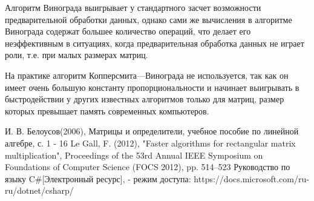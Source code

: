 \documentclass[12pt]{report}
\begin{document}
Алгоритм Винограда выигрывает у стандартного засчет возможности предварительной обработки данных, однако сами же вычисления в алгоритме Винограда содержат большее количество операций, что делает его неэффективным в ситуациях, когда предварительная обработка данных не играет роли, т.е. при малых размерах матриц.

На практике алгоритм Копперсмита—Винограда не используется, так как он имеет очень большую константу пропорциональности и начинает выигрывать в быстродействии у других известных алгоритмов только для матриц, размер которых превышает память современных компьютеров.




\begin{thebibliography}{3}
	И. В. Белоусов(2006), Матрицы и определители, учебное пособие по линейной алгебре, с. 1 - 16
	Le Gall, F. (2012), "Faster algorithms for rectangular matrix multiplication", Proceedings of the 53rd Annual IEEE Symposium on Foundations of Computer Science (FOCS 2012), pp. 514–523
	Руководство по языку C\#[Электронный ресурс], - режим доступа: https://docs.microsoft.com/ru-ru/dotnet/csharp/
\end{thebibliography}
\end{document}
